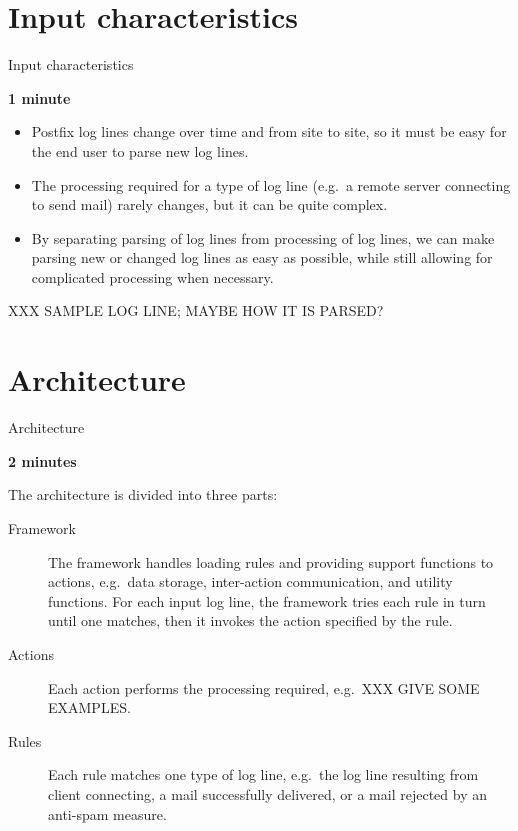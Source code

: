 \documentclass{beamer}
\newcommand{\timingnote}[1]{%
    \textbf{#1}%
}
\begin{document}
\section{Input characteristics}

\begin{frame}{Input characteristics}

    \timingnote{1 minute}

    \begin{itemize}

        \item Postfix log lines change over time and from site to site, so
            it must be easy for the end user to parse new log lines.

        \item The processing required for a type of log line (e.g.\ a
            remote server connecting to send mail) rarely changes, but it
            can be quite complex.

        \item By separating parsing of log lines from processing of log
            lines, we can make parsing new or changed log lines as easy as
            possible, while still allowing for complicated processing when
            necessary.

    \end{itemize}

    XXX SAMPLE LOG LINE\@; MAYBE HOW IT IS PARSED\@?

\end{frame}


\section{Architecture}

\begin{frame}{Architecture}

    \timingnote{2 minutes}

    The architecture is divided into three parts:

    \begin{description}

        \item [Framework] The framework handles loading rules and providing
            support functions to actions, e.g.\ data storage, inter-action
            communication, and utility functions.  For each input log line,
            the framework tries each rule in turn until one matches, then
            it invokes the action specified by the rule.

        \item [Actions] Each action performs the processing required, e.g.\
            XXX GIVE SOME EXAMPLES\@.

        \item [Rules] Each rule matches one type of log line, e.g.\ the log
            line resulting from client connecting, a mail successfully
            delivered, or a mail rejected by an anti-spam measure.

    \end{description}

\end{frame}
\end{document}

